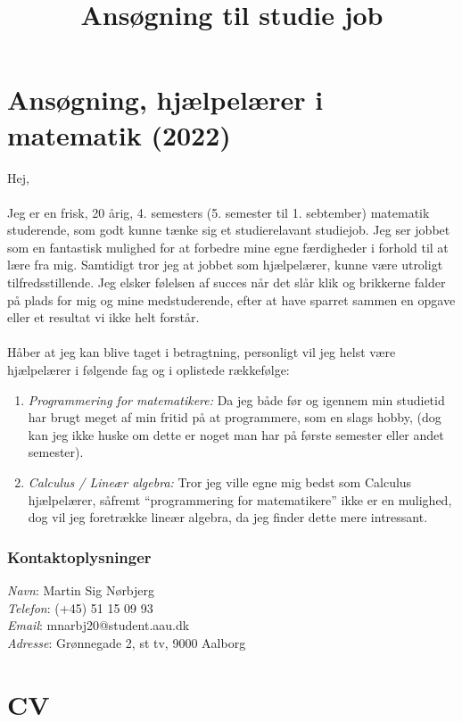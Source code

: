 \documentclass[a4paper, oneside]{book}
\title{Ansøgning til studie job}
\begin{document}
\maketitle

\chapter*{Ansøgning, hjælpelærer i matematik (2022)}
Hej,
\\ \\
Jeg er en frisk, 20 årig, 4. semesters (5. semester til 1. sebtember) matematik studerende, som godt kunne tænke sig et studierelavant studiejob. Jeg ser jobbet som en fantastisk mulighed for at forbedre mine egne færdigheder i forhold til at lære fra mig. Samtidigt tror jeg at jobbet som hjælpelærer, kunne være utroligt tilfredsstillende.
Jeg elsker følelsen af succes når det slår klik og brikkerne falder på plads for mig og mine medstuderende, efter at have sparret sammen en opgave eller et resultat vi ikke helt forstår.
\\ \\
Håber at jeg kan blive taget i betragtning, personligt vil jeg helst være hjælpelærer i følgende fag og i oplistede rækkefølge:
\begin{enumerate}
    \item \textit{Programmering for matematikere:} Da jeg både før og igennem min studietid har brugt meget af min fritid på at programmere, som en slags hobby, (dog kan jeg ikke huske om dette er noget man har på første semester eller andet semester).
    \item \textit{Calculus / Lineær algebra:} Tror jeg ville egne mig bedst som Calculus hjælpelærer, såfremt ``programmering for matematikere'' ikke er en mulighed, dog vil jeg foretrække lineær algebra, da jeg finder dette mere intressant.
\end{enumerate}

\subsection*{Kontaktoplysninger}
\textit{Navn}: Martin Sig Nørbjerg \\
\textit{Telefon}: (+45) 51 15 09 93 \\
\textit{Email}: mnarbj20@student.aau.dk \\
\textit{Adresse}: Grønnegade 2, st tv, 9000 Aalborg

\chapter*{CV}
\end{document}
